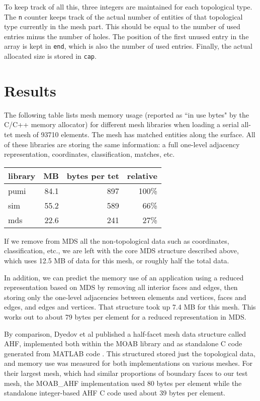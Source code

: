 \documentclass{article}
\begin{document}
To keep track of all this, three integers are maintained for
each topological type.
The \texttt{n} counter keeps track of the actual number of entities
of that topological type currently in the mesh part.
This should be equal to the number of used entries minus the number
of holes.
The position of the first unused entry in the array is kept in
\texttt{end}, which is also the number of used entries.
Finally, the actual allocated size is stored in \texttt{cap}.

\section{Results}

The following table lists mesh memory usage (reported as ``in use bytes"
by the C/C++ memory allocator) for different mesh libraries
when loading a serial all-tet mesh of 93710 elements.
The mesh has matched entities along the surface.
All of these libraries are storing the same information:
a full one-level adjacency representation, coordinates,
classification, matches, etc.

\begin{center}
\begin{tabular}{lrrr}
library & MB & bytes per tet & relative \\\hline
pumi & 84.1 & 897 & 100\% \\
sim  & 55.2 & 589 &  66\% \\
mds  & 22.6 & 241 &  27\% \\
\end{tabular}
\end{center}

If we remove from MDS all the non-topological data such as coordinates,
classification, etc., we are left with the core MDS structure described
above, which uses 12.5 MB of data for this mesh, or roughly half
the total data.

In addition, we can predict the memory use of an application using
a reduced representation based on MDS by removing all interior
faces and edges, then storing only the one-level adjacencies
between elements and vertices, faces and edges, and edges and vertices.
That structure took up 7.4 MB for this mesh.
This works out to about 79 bytes per element for a reduced representation
in MDS.

By comparison, Dyedov et al published a half-facet mesh data structure
called AHF,
implemented both within the MOAB library and as standalone C code
generated from MATLAB code \cite{dyedov2014ahf}.
This structured stored just the topological data, and memory use
was measured for both implementations on various meshes.
For their largest mesh, which had similar proportions of boundary
faces to our test mesh, the MOAB\_AHF implementation used 80 bytes
per element while the standalone integer-based AHF C code used about
39 bytes per element.

{}

\end{document}
